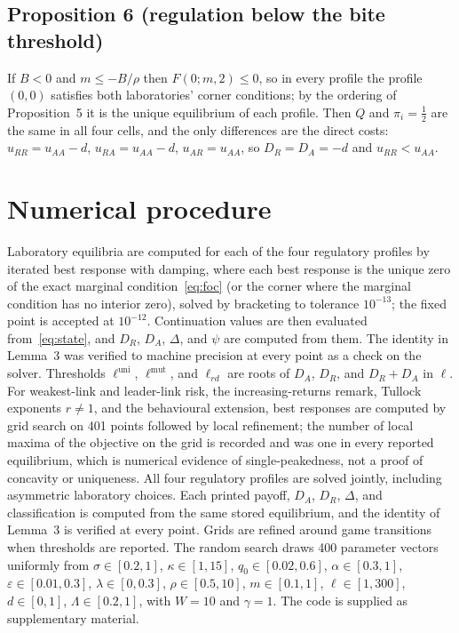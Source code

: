 \documentclass[11pt]{article}
\theoremstyle{plain}
\theoremstyle{definition}
\theoremstyle{remark}
\newcommand{\Lam}{\Lambda}
\newcommand{\Delt}{\Delta}
\begin{document}
\subsection{Proposition 6 (regulation below the bite threshold)}
If $B<0$ and $m\le-B/\rho$ then $F(0;m,2)\le0$, so in every profile the profile $(0,0)$ satisfies both laboratories' corner conditions; by the ordering of Proposition~5 it is the unique equilibrium of each profile. Then $Q$ and $\pi_i=\tfrac12$ are the same in all four cells, and the only differences are the direct costs: $u_{RR}=u_{AA}-d$, $u_{RA}=u_{AA}-d$, $u_{AR}=u_{AA}$, so $D_R=D_A=-d$ and $u_{RR}<u_{AA}$.

\section{Numerical procedure}

Laboratory equilibria are computed for each of the four regulatory profiles by iterated best response with damping, where each best response is the unique zero of the exact marginal condition~\eqref{eq:foc} (or the corner where the marginal condition has no interior zero), solved by bracketing to tolerance $10^{-13}$; the fixed point is accepted at $10^{-12}$. Continuation values are then evaluated from~\eqref{eq:state}, and $D_R$, $D_A$, $\Delt$, and $\psi$ are computed from them. The identity in Lemma~3 was verified to machine precision at every point as a check on the solver. Thresholds $\ell^{\mathrm{uni}}$, $\ell^{\mathrm{mut}}$, and $\ell_{rd}$ are roots of $D_A$, $D_R$, and $D_R+D_A$ in $\ell$. For weakest-link and leader-link risk, the increasing-returns remark, Tullock exponents $r\neq1$, and the behavioural extension, best responses are computed by grid search on 401 points followed by local refinement; the number of local maxima of the objective on the grid is recorded and was one in every reported equilibrium, which is numerical evidence of single-peakedness, not a proof of concavity or uniqueness. All four regulatory profiles are solved jointly, including asymmetric laboratory choices. Each printed payoff, $D_A$, $D_R$, $\Delt$, and classification is computed from the same stored equilibrium, and the identity of Lemma~3 is verified at every point. Grids are refined around game transitions when thresholds are reported. The random search draws 400 parameter vectors uniformly from $\sigma\in[0.2,1]$, $\kappa\in[1,15]$, $q_0\in[0.02,0.6]$, $\alpha\in[0.3,1]$, $\varepsilon\in[0.01,0.3]$, $\lambda\in[0,0.3]$, $\rho\in[0.5,10]$, $m\in[0.1,1]$, $\ell\in[1,300]$, $d\in[0,1]$, $\Lam\in[0.2,1]$, with $W=10$ and $\gamma=1$. The code is supplied as supplementary material.
\end{document}
